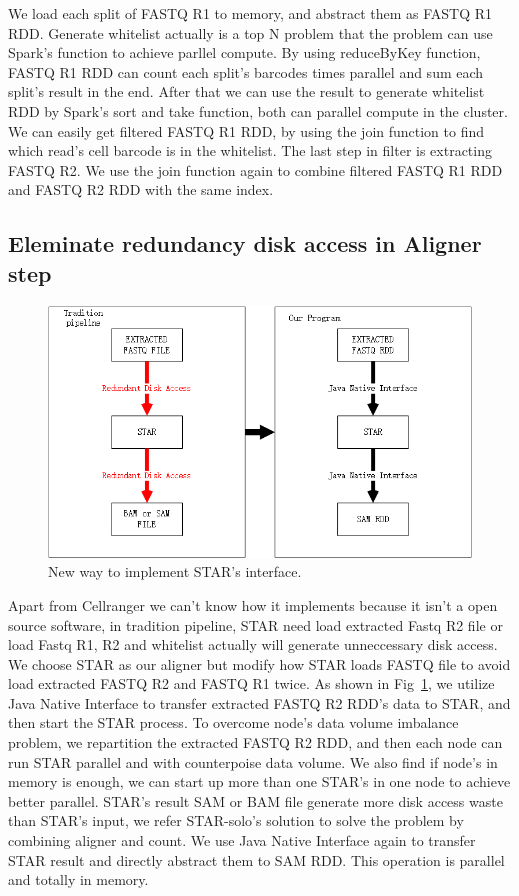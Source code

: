 \documentclass[runningheads]{llncs}
\begin{document}
We load each split of FASTQ R1 to memory, and abstract them as FASTQ R1 RDD.
Generate whitelist actually is a top N problem that the problem can use Spark's function to achieve parllel compute.
By using reduceByKey function, FASTQ R1 RDD can count each split's barcodes times parallel and sum each split's result in the end.
After that we can use the result to generate whitelist RDD by Spark's sort and take function, both can parallel compute in the cluster.
We can easily get filtered FASTQ R1 RDD, by using the join function to find which read's cell barcode is in the whitelist.
The last step in filter is extracting FASTQ R2.
We use the join function again to combine filtered FASTQ R1 RDD and FASTQ R2 RDD with the same index.
\subsection{Eleminate redundancy disk access in Aligner step}
\begin{figure}
  \includegraphics[width=\textwidth]{fig2.png}
  \caption{New way to implement STAR's interface.} \label{fig2}
\end{figure}
Apart from Cellranger we can't know how it implements because it isn't a open source software, in tradition pipeline, STAR need load extracted Fastq R2 file or load Fastq R1, R2 and whitelist actually will generate unneccessary disk access.  
We choose STAR as our aligner but modify how STAR loads FASTQ file to avoid load extracted FASTQ R2 and FASTQ R1 twice. 
As shown in Fig~\ref{fig2}, we utilize Java Native Interface to transfer extracted FASTQ R2 RDD's data to STAR, and then start the STAR process.
To overcome node's data volume imbalance problem, we repartition the extracted FASTQ R2 RDD, and then each node can run STAR parallel and with counterpoise data volume.
We also find if node's in memory is enough, we can start up more than one STAR's in one node to achieve better parallel.
STAR's result SAM or BAM file generate more disk access waste than STAR's input, we refer STAR-solo's solution to solve the problem by combining aligner and count.
We use Java Native Interface again to transfer STAR result and directly abstract them to SAM RDD.
This operation is parallel and totally in memory.
\end{document}
